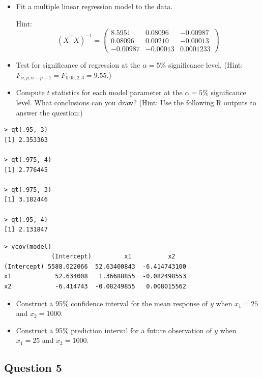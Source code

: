 \begin{itemize}
\item[(a)] Fit a multiple linear regression model to the data.

Hint:
\[
(X^\top X)^{-1} =
\begin{pmatrix}
8.5951 & 0.08096 & -0.00987 \\
0.08096 & 0.00210 & -0.00013 \\
-0.00987 & -0.00013 & 0.0001233
\end{pmatrix}
\]

\item[(b)] Test for significance of regression at the $\alpha = 5\%$ significance level. (Hint: $F_{\alpha,p,n-p-1} = F_{0.05,2,3} = 9.55$.)

\item[(c)] Compute $t$ statistics for each model parameter at the $\alpha = 5\%$ significance level. What conclusions can you draw? (Hint: Use the following R outputs to answer the question:)

\end{itemize}

\begin{verbatim}
> qt(.95, 3)
[1] 2.353363

> qt(.975, 4)
[1] 2.776445

> qt(.975, 3)
[1] 3.182446

> qt(.95, 4)
[1] 2.131847
\end{verbatim}

\begin{verbatim}
> vcov(model)
             (Intercept)         x1          x2
(Intercept) 5588.022066  52.63400843  -6.414743100
x1            52.634008   1.36688855  -0.082498553
x2            -6.414743  -0.08249855   0.008015562
\end{verbatim}

\begin{itemize}
\item[(d)] Construct a 95\% confidence interval for the mean response of $y$ when $x_1 = 25$ and $x_2 = 1000$.

\item[(e)] Construct a 95\% prediction interval for a future observation of $y$ when $x_1 = 25$ and $x_2 = 1000$.
\end{itemize}

\clearpage

\subsection{Question 5}


